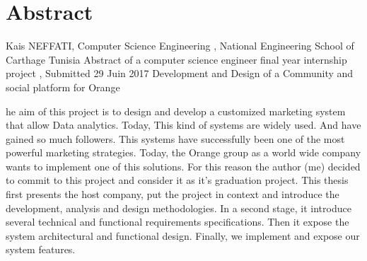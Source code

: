 %
%
%

\chapter*{Abstract}
Kais NEFFATI, Computer Science Engineering , National Engineering School of Carthage Tunisia 
\newline
\newline
Abstract of a computer science engineer final year internship project , Submitted 29 Juin 2017 
\newline
\newline
Development and Design of a Community and social platform for Orange
\newline
\newline
\newline
\begin{SingleSpace}
he aim of this project is to design and develop a customized marketing system that allow Data analytics.
Today, This kind of systems are widely used. And have gained so much followers.
 This systems have successfully been one of the most powerful marketing strategies. 
 Today, the Orange group as a world wide company wants to implement one of this solutions. 
 For this reason the author (me) decided to commit to this project and consider it as it's graduation project.
This thesis first presents the host company, put the project in context and introduce the development, 
analysis and design methodologies. 
In a second stage, it introduce several technical and functional requirements specifications. 
Then it expose the system architectural and functional design.
Finally, we implement and expose our system features.

\end{SingleSpace}
\clearpage